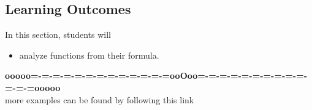 \documentclass{ximera}
\begin{document}
\subsection{Learning Outcomes}



\begin{sectionOutcomes}
In this section, students will 

\begin{itemize}
\item analyze functions from their formula.
\end{itemize}
\end{sectionOutcomes}








\begin{center}
\textbf{\textcolor{green!50!black}{ooooo=-=-=-=-=-=-=-=-=-=-=-=-=ooOoo=-=-=-=-=-=-=-=-=-=-=-=-=ooooo}} \\

more examples can be found by following this link\\ 

\end{center}
\end{document}
